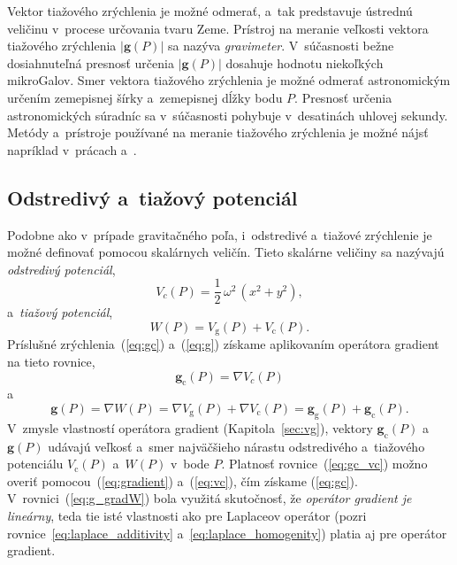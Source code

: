 \documentclass[a4paper, 12pt]{book}
\newcommand{\gidx}{\mathrm g}
\newcommand{\cidx}{\mathrm c}
\let\vec\mathbf
\begin{document}
Vektor tiažového zrýchlenia je možné odmerať, a~tak predstavuje ústrednú 
veličinu v~procese určovania tvaru Zeme.  Prístroj na meranie veľkosti vektora 
tiažového zrýchlenia $| \vec g(P) |$ sa nazýva \emph{gravimeter}.  V~súčasnosti 
bežne dosiahnuteľná presnosť určenia $| \vec g(P) |$ dosahuje hodnotu 
niekoľkých mikroGalov.  Smer vektora tiažového zrýchlenia je možné odmerať 
astronomickým určením zemepisnej šírky a~zemepisnej dĺžky bodu $P$.  Presnosť 
určenia astronomických súradníc sa v~súčasnosti pohybuje v~desatinách uhlovej 
sekundy.  Metódy a~prístroje používané na meranie tiažového zrýchlenia je možné 
nájsť napríklad v~prácach \cite{Torge1989} a~\cite{Janak2010}.






\subsection{Odstredivý a~tiažový potenciál}

Podobne ako v~prípade gravitačného poľa, i~odstredivé a~tiažové zrýchlenie je 
možné definovať pomocou skalárnych veličín.  Tieto skalárne veličiny sa 
nazývajú \emph{odstredivý potenciál},
%
\begin{equation}
\label{eq:vc}
V_c(P) = \frac{1}{2} \, \omega^2 \, (x^2 + y^2){,}
\end{equation}
%
a~\emph{tiažový potenciál},
%
\begin{equation}
\label{eq:w}
W(P) = V_\gidx(P) + V_\cidx(P){.}
\end{equation}
%
Príslušné zrýchlenia~(\ref{eq:gc}) a~(\ref{eq:g}) získame aplikovaním operátora 
gradient na tieto rovnice,
%
\begin{equation}
\label{eq:gc_vc}
\vec g_\cidx(P) = \nabla V_c(P)
\end{equation}
%
a
%
\begin{equation}
\label{eq:g_gradW}
\vec g(P) = \nabla W(P) = \nabla V_\gidx(P) + \nabla V_\cidx(P) = \vec 
g_\gidx(P) + \vec g_\cidx(P){.}
\end{equation}
%
V~zmysle vlastností operátora gradient (Kapitola~\ref{sec:vg}), vektory $\vec 
g_\cidx(P)$ a~$\vec g(P)$ udávajú veľkosť a~smer najväčšieho nárastu 
odstredivého a~tiažového potenciálu $V_\cidx(P)$ a~$W(P)$ v~bode $P$.  Platnosť 
rovnice~(\ref{eq:gc_vc}) možno overiť pomocou~(\ref{eq:gradient}) 
a~(\ref{eq:vc}), čím získame (\ref{eq:gc}).  V~rovnici~(\ref{eq:g_gradW}) bola 
využitá skutočnosť, že \emph{operátor gradient je lineárny}, teda tie isté 
vlastnosti ako pre Laplaceov operátor (pozri 
rovnice~\ref{eq:laplace_additivity} a~\ref{eq:laplace_homogenity}) platia aj 
pre operátor gradient.
\end{document}

